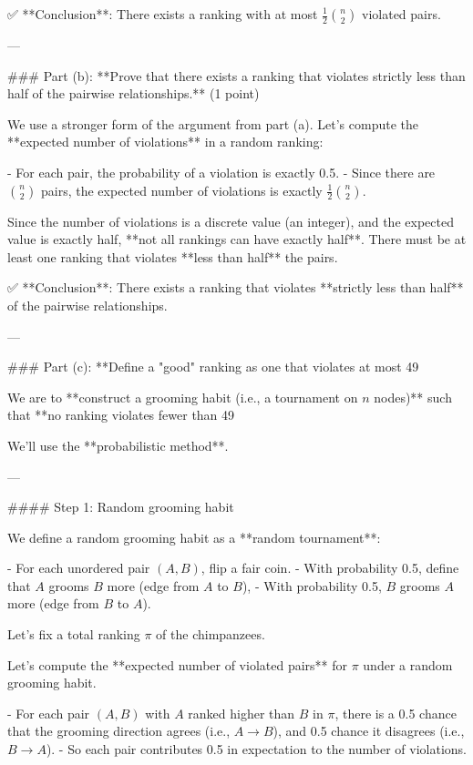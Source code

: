 \begin{enumerate}
\begin{shaded}
✅ **Conclusion**: There exists a ranking with at most \(\frac{1}{2} \binom{n}{2}\) violated pairs.

---

### Part (b): **Prove that there exists a ranking that violates strictly less than half of the pairwise relationships.** (1 point)

We use a stronger form of the argument from part (a). Let's compute the **expected number of violations** in a random ranking:

- For each pair, the probability of a violation is exactly 0.5.
- Since there are \(\binom{n}{2}\) pairs, the expected number of violations is exactly \(\frac{1}{2} \binom{n}{2}\).

Since the number of violations is a discrete value (an integer), and the expected value is exactly half, **not all rankings can have exactly half**. There must be at least one ranking that violates **less than half** the pairs.

✅ **Conclusion**: There exists a ranking that violates **strictly less than half** of the pairwise relationships.

---

### Part (c): **Define a "good" ranking as one that violates at most 49%

We are to **construct a grooming habit (i.e., a tournament on \(n\) nodes)** such that **no ranking violates fewer than 49%

We'll use the **probabilistic method**.

---

#### Step 1: Random grooming habit

We define a random grooming habit as a **random tournament**:

- For each unordered pair \((A, B)\), flip a fair coin.
- With probability 0.5, define that \(A\) grooms \(B\) more (edge from \(A\) to \(B\)),
- With probability 0.5, \(B\) grooms \(A\) more (edge from \(B\) to \(A\)).

Let's fix a total ranking \(\pi\) of the chimpanzees.

Let's compute the **expected number of violated pairs** for \(\pi\) under a random grooming habit.

- For each pair \((A, B)\) with \(A\) ranked higher than \(B\) in \(\pi\), there is a 0.5 chance that the grooming direction agrees (i.e., \(A \to B\)), and 0.5 chance it disagrees (i.e., \(B \to A\)).
- So each pair contributes 0.5 in expectation to the number of violations.


\end{shaded}
\end{enumerate}
